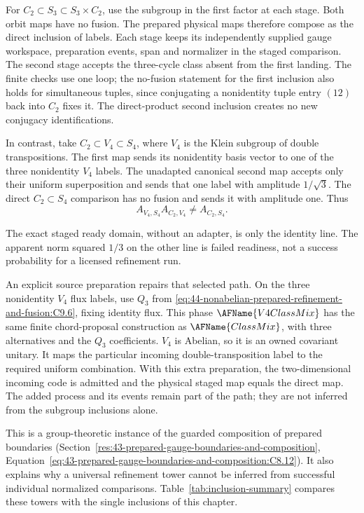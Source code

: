 For $C_2\subset S_3\subset S_3\times C_2$, use the subgroup in the first factor
at each stage.  Both orbit maps have no fusion.  The prepared physical maps
therefore compose as the direct inclusion of labels.  Each stage keeps its
independently supplied gauge workspace, preparation events, span and
normalizer in the staged comparison.  The second stage accepts the three-cycle
class absent from the first landing.  The finite checks use one loop; the
no-fusion statement for the first inclusion also holds for simultaneous
tuples, since conjugating a nonidentity tuple entry $(12)$ back into $C_2$
fixes it.  The direct-product second inclusion creates no new conjugacy
identifications.

In contrast, take $C_2\subset V_4\subset S_4$, where $V_4$ is the Klein
subgroup of double transpositions.  The first map sends its nonidentity basis
vector to one of the three nonidentity $V_4$ labels.  The unadapted canonical
second map accepts only their uniform superposition and sends that one label
with amplitude $1/\sqrt3$.  The direct $C_2\subset S_4$ comparison has no
fusion and sends it with amplitude one.  Thus
\begin{equation}
A_{V_4,S_4}A_{C_2,V_4}\ne A_{C_2,S_4}.
 \label{eq:44-nonabelian-prepared-refinement-and-fusion:C9.18}
\end{equation}

The exact staged ready domain, without an adapter, is only the identity line.
The apparent norm squared $1/3$ on the other line is failed readiness, not a
success probability for a licensed refinement run.

An explicit source preparation repairs that selected path.  On the three
nonidentity $V_4$ flux labels, use $Q_3$ from
\eqref{eq:44-nonabelian-prepared-refinement-and-fusion:C9.6}, fixing identity
flux.  This phase $\AFName{V4ClassMix}$ has the same finite chord-proposal
construction as $\AFName{ClassMix}$, with three alternatives and the $Q_3$
coefficients.  $V_4$ is Abelian, so it is an owned covariant unitary.  It maps
the particular incoming double-transposition label to the required uniform
combination.  With this extra preparation, the two-dimensional incoming code
is admitted and the physical staged map equals the direct map.  The added
process and its events remain part of the path; they are not inferred from the
subgroup inclusions alone.

This is a group-theoretic instance of the guarded composition of prepared
boundaries (Section~\ref{res:43-prepared-gauge-boundaries-and-composition},
Equation~\eqref{eq:43-prepared-gauge-boundaries-and-composition:C8.12}).  It
also explains why a universal refinement tower cannot be inferred from
successful individual normalized comparisons.
Table~\ref{tab:inclusion-summary} compares these towers with the single
inclusions of this chapter.
